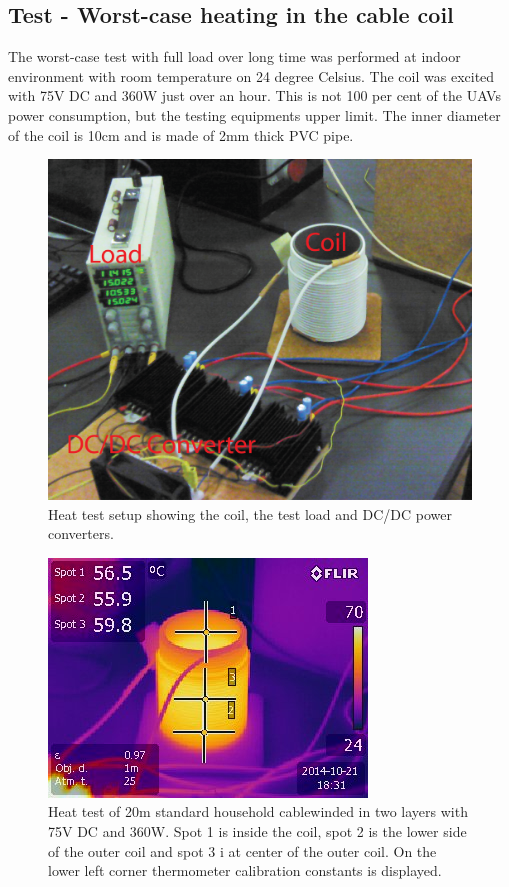 \subsection{Test - Worst-case heating in the cable coil}
The worst-case test with full load over long time was performed at indoor environment with room temperature on 24 degree Celsius. The coil was excited with 75V DC and 360W just over an hour. This is not 100 per cent of the UAVs power consumption, but the testing equipments upper limit. The inner diameter of the coil is 10cm and is made of 2mm thick PVC pipe.


\begin{figure}[H]
   \centering
   \includegraphics[scale=0.5]{graphics/heat_test/heat_test_setup.png}
   \caption{Heat test setup showing the coil, the test load and DC/DC power converters.}
   \end{figure}
      

\begin{figure}[H]
\centering
\includegraphics[scale=1]{graphics/heat_test/IR_1491.jpg}
\caption[Heat test, image from thermal camera]{Heat test of 20m standard household cable\footnotemark winded in two layers with 75V DC and 360W. Spot 1 is inside the coil, spot 2 is the lower side of the outer coil and spot 3 i at center of the outer coil. On the lower left corner thermometer calibration constants is displayed.}
\label{fig:heat_test_ir}
\end{figure}

